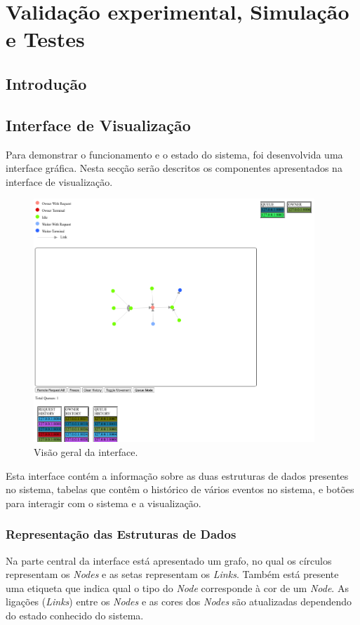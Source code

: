 \chapter{Validação experimental, Simulação e Testes}
\label{chap:validacao}

\section{Introdução}
\label{validacao:sec:introducao}

\section{Interface de Visualização}
\label{validacao:sec:interface}
Para demonstrar o funcionamento e o estado do sistema, foi desenvolvida uma interface gráfica. Nesta secção serão descritos os componentes apresentados na interface de visualização.

\begin{figure}[!htb]
\centering
\includegraphics[width=300pt]{relatorio_overview.png}
\caption{Visão geral da interface.}
\end{figure}

Esta interface contém a informação sobre as duas estruturas de dados presentes no sistema, tabelas que contêm o histórico de vários eventos no sistema, e botões para interagir com o sistema e a visualização.


\subsection*{Representação das Estruturas de Dados}
Na parte central da interface está apresentado um grafo, no qual os círculos representam os \emph{Nodes} e as setas representam os \emph{Links}. 
Também está presente uma etiqueta que indica qual o tipo do \emph{Node} corresponde à cor de um \emph{Node}.
As ligações (\emph{Links}) entre os \emph{Nodes} e as cores dos \emph{Nodes} são atualizadas dependendo do estado conhecido do sistema. 

